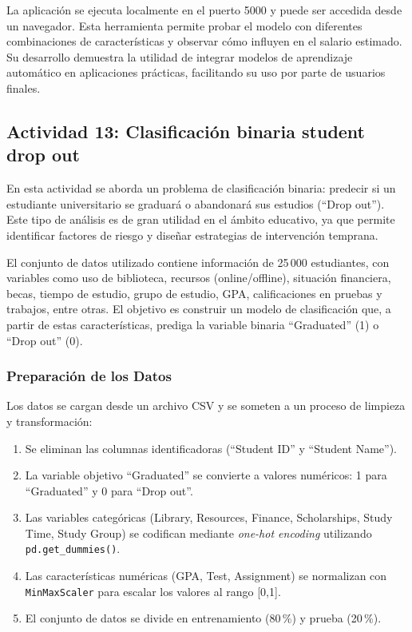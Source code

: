 \documentclass[12pt]{article}
\begin{document}
La aplicación se ejecuta localmente en el puerto 5000 y puede ser accedida desde un navegador. Esta herramienta permite probar el modelo con diferentes combinaciones de características y observar cómo influyen en el salario estimado. Su desarrollo demuestra la utilidad de integrar modelos de aprendizaje automático en aplicaciones prácticas, facilitando su uso por parte de usuarios finales.

\subsection{Actividad 13: Clasificación binaria student drop out}

En esta actividad se aborda un problema de clasificación binaria: predecir si un estudiante universitario se graduará o abandonará sus estudios (``Drop out''). Este tipo de análisis es de gran utilidad en el ámbito educativo, ya que permite identificar factores de riesgo y diseñar estrategias de intervención temprana.

El conjunto de datos utilizado contiene información de 25\,000 estudiantes, con variables como uso de biblioteca, recursos (online/offline), situación financiera, becas, tiempo de estudio, grupo de estudio, GPA, calificaciones en pruebas y trabajos, entre otras. El objetivo es construir un modelo de clasificación que, a partir de estas características, prediga la variable binaria ``Graduated'' (1) o ``Drop out'' (0).

\subsubsection*{Preparación de los Datos}

Los datos se cargan desde un archivo CSV y se someten a un proceso de limpieza y transformación:

\begin{enumerate}
    \item Se eliminan las columnas identificadoras (``Student ID'' y ``Student Name'').
    \item La variable objetivo ``Graduated'' se convierte a valores numéricos: 1 para ``Graduated'' y 0 para ``Drop out''.
    \item Las variables categóricas (Library, Resources, Finance, Scholarships, Study Time, Study Group) se codifican mediante \textit{one-hot encoding} utilizando \texttt{pd.get\_dummies()}.
    \item Las características numéricas (GPA, Test, Assignment) se normalizan con \texttt{MinMaxScaler} para escalar los valores al rango [0,1].
    \item El conjunto de datos se divide en entrenamiento (80\,\%) y prueba (20\,\%).
\end{enumerate}
\end{document}
